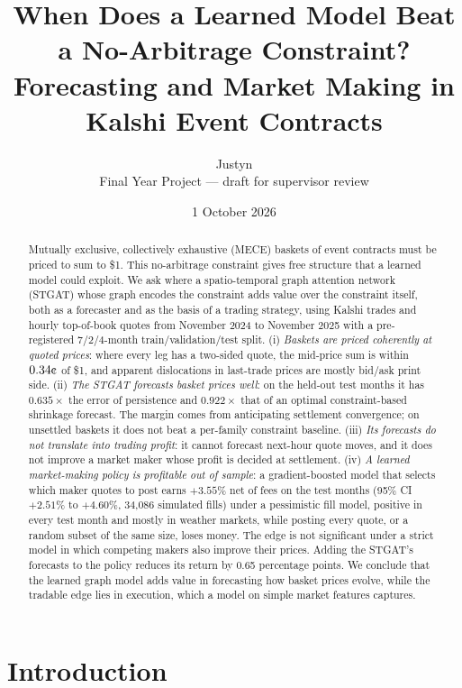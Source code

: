 \documentclass[11pt,a4paper]{article}
\title{\textbf{When Does a Learned Model Beat a No-Arbitrage Constraint?}\\[4pt]
\large Forecasting and Market Making in Kalshi Event Contracts}
\author{Justyn\\[2pt]
\small Final Year Project --- draft for supervisor review}
\date{1 October 2026}
\newcommand{\cent}{\text{\textcent}}
\newcommand{\x}{\ensuremath{\times}}
\begin{document}
\maketitle

\begin{abstract}
Mutually exclusive, collectively exhaustive (MECE) baskets of event contracts must be priced to sum to \$1. This
no-arbitrage constraint gives free structure that a learned model could exploit. We ask where a spatio-temporal graph
attention network (STGAT) whose graph encodes the constraint adds value over the constraint itself, both as a
forecaster and as the basis of a trading strategy, using Kalshi trades and hourly top-of-book quotes from November
2024 to November 2025 with a pre-registered 7/2/4-month train/validation/test split.
(i) \emph{Baskets are priced coherently at quoted prices}: where every leg has a two-sided quote, the mid-price sum
is within $0.34\cent$ of \$1, and apparent dislocations in last-trade prices are mostly bid/ask print side.
(ii) \emph{The STGAT forecasts basket prices well}: on the held-out test months it has $0.635\x$ the error of
persistence and $0.922\x$ that of an optimal constraint-based shrinkage forecast. The margin comes from anticipating
settlement convergence; on unsettled baskets it does not beat a per-family constraint baseline.
(iii) \emph{Its forecasts do not translate into trading profit}: it cannot forecast next-hour quote moves, and it
does not improve a market maker whose profit is decided at settlement.
(iv) \emph{A learned market-making policy is profitable out of sample}: a gradient-boosted model that selects which
maker quotes to post earns $+3.55\%$ net of fees on the test months (95\% CI $+2.51\%$ to $+4.60\%$, 34{,}086
simulated fills) under a pessimistic fill model, positive in every test month and mostly in weather markets, while
posting every quote, or a random subset of the same size, loses money. The edge is not significant
under a strict model in which competing makers also improve their prices. Adding the STGAT's forecasts to the policy
reduces its return by 0.65 percentage points. We conclude that the learned graph model adds value in forecasting how
basket prices evolve, while the tradable edge lies in execution, which a model on simple market features captures.
\end{abstract}

\section{Introduction}
\end{document}
